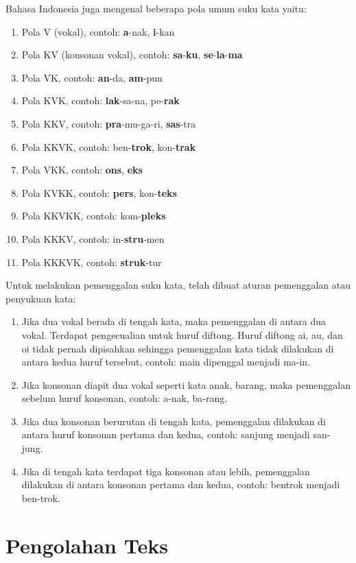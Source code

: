 Bahasa Indonesia juga mengenal beberapa pola umum suku kata yaitu:

\begin{enumerate}
	\item Pola V (vokal), contoh: \textbf{a}-nak, \textbf{i}-kan
	\item Pola KV (konsonan vokal), contoh: \textbf{sa}-\textbf{ku}, \textbf{se}-\textbf{la}-\textbf{ma}
	\item Pola VK, contoh: \textbf{an}-da, \textbf{am}-pun
	\item Pola KVK, contoh: \textbf{lak}-sa-na, pe-\textbf{rak}
	\item Pola KKV, contoh: \textbf{pra}-mu-ga-ri, \textbf{sas}-tra
	\item Pola KKVK, contoh: ben-\textbf{trok}, kon-\textbf{trak}
	\item Pola VKK, contoh: \textbf{ons}, \textbf{eks}
	\item Pola KVKK, contoh: \textbf{pers}, kon-\textbf{teks}
	\item Pola KKVKK, contoh: kom-\textbf{pleks}
	\item Pola KKKV, contoh: in-\textbf{stru}-men
	\item Pola KKKVK, contoh: \textbf{struk}-tur
\end{enumerate}

Untuk melakukan pemenggalan suku kata, telah dibuat aturan pemenggalan atau penyukuan kata:

\begin{enumerate}
	\item Jika dua vokal berada di tengah kata, maka pemenggalan di antara dua vokal. Terdapat pengecualian untuk huruf diftong. Huruf diftong ai, au, dan oi tidak pernah dipisahkan sehingga pemenggalan kata tidak dilakukan di antara kedua huruf tersebut, contoh: main dipenggal menjadi ma-in.
	\item Jika konsonan diapit dua vokal seperti kata anak, barang, maka pemenggalan sebelum huruf konsonan, contoh: a-nak, ba-rang.
	\item Jika dua konsonan berurutan di tengah kata, pemenggalan dilakukan di antara huruf konsonan pertama dan kedua, contoh: sanjung menjadi san-jung.
	\item Jika di tengah kata terdapat tiga konsonan atau lebih, pemenggalan dilakukan di antara konsonan pertama dan kedua, contoh: bentrok menjadi ben-trok.
\end{enumerate}

\section{Pengolahan Teks}
\label{sec:pengolahan_teks}

